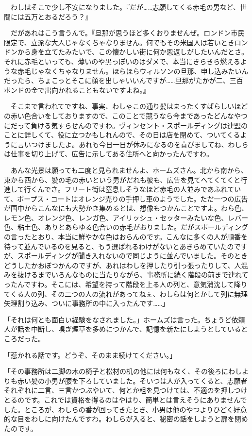 \documentclass[tate,paper=b6j,jafontsize=9pt]{jlreq}
\begin{document}
　わしはそこで少し不安になりました。『だが……志願してくる赤毛の男など、世間には五万とおるだろう？』

　だがあれはこう言うんで。『旦那が思うほど多くおりませんぜ。ロンドン市民限定で、立派な大人じゃなくちゃなりません。何でもその米国人は若いときロンドンから身を立てたみたいで、この懐かしい街に何か恩返しがしたいんだとさ。それに赤毛といっても、薄いのや黒っぽいのはダメで、本当にきらきら燃えるような赤毛じゃなくちゃなりません。ほらほらウィルソンの旦那、申し込みたいんだったら、ちょこっとそこに顔を出しゃいいんですが……旦那がたかが二、三百ポンドの金で出向かれることもないですよね。』

　そこまで言われてですね、事実、わしゃこの通り髪はまったくすばらしいほどの赤い色合いをしておりますので、このことで競うなら今まであったどんなやつにだって負ける気すらせんのですわ。ヴィンセント・スポールディングは連盟のことに詳しくて、役に立つかもしれんので、その日は店を閉めて、ついてくるように言いつけましたよ。あれも今日一日が休みになるのを喜びましてね、わしらは仕事を切り上げて、広告に示してある住所へと向かったんですわ。

　あんな光景は願っても二度と見られませんよ、ホームズさん。北から南から、東から西から、髪の毛の赤いという男がだれも彼も、広告を見てへてくてくと行進して行くんでさ。フリート街は窒息しそうなほど赤毛の人並みであふれていて、ポープス・コートはオレンジ売りの手押し車のようでした。ただ一つの広告が国中からこんなにも大勢かき集めるとは、想像もつかんことですよ。わら色、レモン色、オレンジ色、レンガ色、アイリッシュ・セッターみたいな色、レバー色、粘土色、ありとあらゆる色合いの赤毛がおりました。だがスポールディングの言ったとおり、本当に鮮やかな色はおらんのです。こんなに多くの人が順番を待って並んでいるのを見ると、もう選ばれるわけがないとあきらめていたのですが、スポールディングが聞き入れないので同じように並んでいました。そのときどうしたかおぼつかんのですが、あれはわしを押したり引っ張ったりして、人混みを抜けるまでいろんなものに当たりながら、事務所に続く階段の前まで連れてったんですわ。そこには、希望を持って階段を上る人の列と、意気消沈して降りてくる人の列、その二つの人の流れがあってねぇ、わしらは何とかして列に無理矢理割り込み、ついに事務所の中に入ったんです……」

「それは何とも面白い経験をなされました。」ホームズは言った。ちょうど依頼人が話を中断し、嗅ぎ煙草を多めにつかんで、記憶を新たにしようとしているところだった。

「惹かれる話です。どうぞ、そのまま続けてください。」

「その事務所は二脚の木の椅子と松材の机の他には何もなく、その後ろにわしよりも赤い髪の小男が腰を下ろしていました。そいつは人が入ってくると、志願者それぞれに二言、三言かつぶやいて、何とか粗を見つけては、不適のを押しつけとるのです。これでは資格を得るのはやはり、簡単とは言えそうにありませんでした。ところが、わしらの番が回ってきたとき、小男は他のやつよりひどく好意的な目をわしに向けたんですわ。わしらが入ると、秘密の話をしようと扉を閉めたのです。
\end{document}
